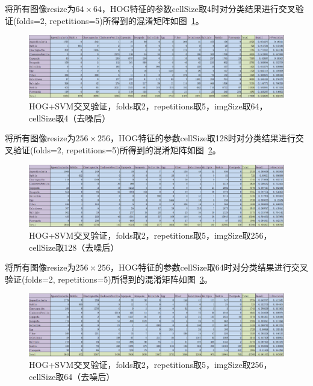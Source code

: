 \documentclass[12pt]{article}
\begin{document}
将所有图像resize为$64 \times 64$，HOG特征的参数cellSize取4时对分类结果进行交叉验证(folds=2, repetitions=5)所得到的混淆矩阵如图~\ref{fig:HOG-SVM-2-folds-5-repetitions-4-64-noNoise}。
\begin{figure}[!ht]
\centering
\includegraphics[width=1.0\linewidth]{HOG-SVM-2-folds-5-repetitions-4-64-noNoise}
\caption{HOG+SVM交叉验证，folds取2，repetitions取5，imgSize取64，cellSize取4（去噪后）}
\label{fig:HOG-SVM-2-folds-5-repetitions-4-64-noNoise}
\end{figure}

将所有图像resize为$256 \times 256$，HOG特征的参数cellSize取128时对分类结果进行交叉验证(folds=2, repetitions=5)所得到的混淆矩阵如图~\ref{fig:HOG-SVM-2-folds-5-repetitions-128-256-noNoise}。
\begin{figure}[!ht]
\centering
\includegraphics[width=1.0\linewidth]{HOG-SVM-2-folds-5-repetitions-128-256-noNoise}
\caption{HOG+SVM交叉验证，folds取2，repetitions取5，imgSize取256，cellSize取128（去噪后）}
\label{fig:HOG-SVM-2-folds-5-repetitions-128-256-noNoise}
\end{figure}

将所有图像resize为$256 \times 256$，HOG特征的参数cellSize取64时对分类结果进行交叉验证(folds=2, repetitions=5)所得到的混淆矩阵如图~\ref{fig:HOG-SVM-2-folds-5-repetitions-64-256-noNoise}。
\begin{figure}[!ht]
\centering
\includegraphics[width=1.0\linewidth]{HOG-SVM-2-folds-5-repetitions-64-256-noNoise}
\caption{HOG+SVM交叉验证，folds取2，repetitions取5，imgSize取256，cellSize取64（去噪后）}
\label{fig:HOG-SVM-2-folds-5-repetitions-64-256-noNoise}
\end{figure}
\end{document}
